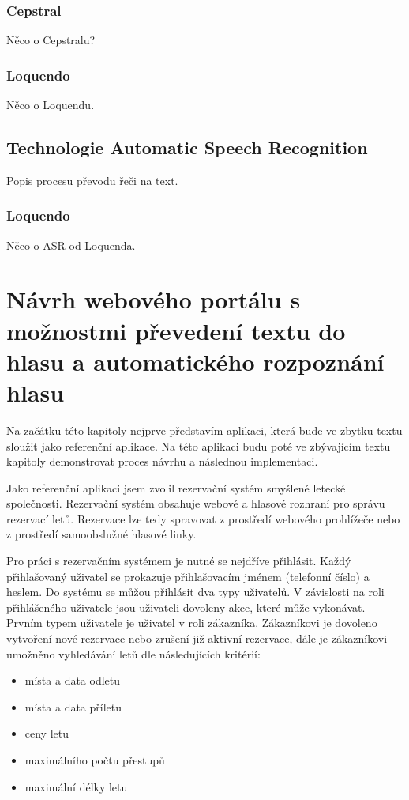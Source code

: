 \documentclass[ing,male,java,dept460]{diploma}						%
\begin{document}
\subsubsection{Cepstral}
Něco o Cepstralu?

\subsubsection{Loquendo}
Něco o Loquendu.

\subsection{Technologie Automatic Speech Recognition}
Popis procesu převodu řeči na text.

\subsubsection{Loquendo}
Něco o ASR od Loquenda.

\section{Návrh webového portálu s možnostmi převedení textu do hlasu a automatického rozpoznání hlasu}
\label{sec:Navrh}
Na začátku této kapitoly nejprve představím aplikaci, která bude ve zbytku textu sloužit jako referenční aplikace. Na této aplikaci budu poté ve zbývajícím textu kapitoly demonstrovat proces návrhu a následnou implementaci.

Jako referenční aplikaci jsem zvolil rezervační systém smyšlené letecké společnosti. Rezervační systém obsahuje webové a hlasové rozhraní pro správu rezervací letů. Rezervace lze tedy spravovat z prostředí webového prohlížeče nebo z prostředí samoobslužné hlasové linky.

Pro práci s rezervačním systémem je nutné se nejdříve přihlásit. Každý přihlašovaný uživatel se prokazuje přihlašovacím jménem (telefonní číslo) a heslem. Do systému se můžou přihlásit dva typy uživatelů. V závislosti na roli přihlášeného uživatele jsou uživateli dovoleny akce, které může vykonávat. Prvním typem uživatele je uživatel v roli zákazníka. Zákazníkovi je dovoleno vytvoření nové rezervace nebo zrušení již aktivní rezervace, dále je zákazníkovi umožněno vyhledávání letů dle následujících kritérií:

\begin{itemize}
\item místa a data odletu
\item místa a data příletu
\item ceny letu
\item maximálního počtu přestupů
\item maximální délky letu
\end{itemize}
\end{document}
